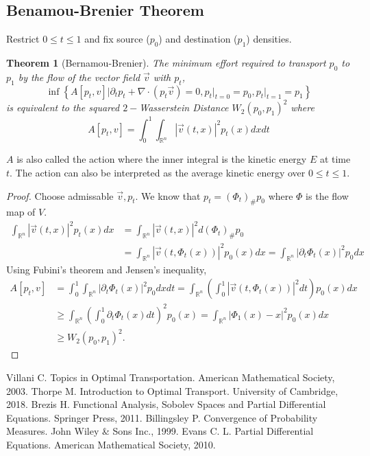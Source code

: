 \documentclass[12pt]{article}
\theoremstyle{plain}
\newtheorem{thm}{Theorem}[section]
\numberwithin{equation}{section}
\begin{document}
\subsection{Benamou-Brenier Theorem}
Restrict $0\le t \le 1$ and fix source ($p_0$) and destination ($p_1$) densities.
\begin{thm}[Bernamou-Brenier]
	The minimum effort required to transport $p_0$ to $p_1$ by the flow of the vector field $\vec{v}$ with $p_t$,
	\begin{equation}
		\inf\left\{A[p_t,v]\bigg\vert\partial_t p_t + \nabla \cdot (p_t \vec{v}) = 0,p_t\vert_{t=0}=p_0, p_t\vert_{t=1}=p_1\right\}
	\end{equation} 
	is equivalent to the squared $2-$Wasserstein Distance $W_2(p_0,p_1)^2$ where \[A[p_t,v] = \int_0^1\int_{\mathbb{R}^n} |\vec{v}(t,x)|^2p_t(x)dxdt\]
\end{thm}
$A$ is also called the action where the inner integral is the kinetic energy $E$ at time $t$. The action can also be interpreted as the average kinetic energy over $0\le t \le 1$. 
\begin{proof}
	Choose admissable $\vec{v},p_t$. We know that $p_t = (\Phi_t)_\#p_0$ where $\Phi$ is the flow map of $V$.
	\begin{align*}
		\int_{\mathbb{R}^n}|\vec{v}(t,x)|^2p_t(x)dx &= \int_{\mathbb{R}^n}|\vec{v}(t,x)|^2 d(\Phi_t)_\#p_0\\
		&= \int_{\mathbb{R}^n}|\vec{v}(t,\Phi_t(x))|^2p_0(x)dx = \int_{\mathbb{R}^n}|\partial_t\Phi_t(x)|^2p_0dx
	\end{align*}
	Using Fubini's theorem and Jensen's inequality,
	\begin{align*}
		A[p_t,v] &= \int_0^1\int_{\mathbb{R}^n}|\partial_t\Phi_t(x)|^2p_0dxdt= \int_{\mathbb{R}^n}\left(\int_0^1|\vec{v}(t,\Phi_t(x))|^2dt\right)p_0(x)dx \\
		&\ge \int_{\mathbb{R}^n}\left(\int_0^1\partial_t\Phi_t(x)dt\right)^2p_0(x) = \int_{\mathbb{R}^n}|\Phi_1(x) - x|^2p_0(x)dx\\
		& \ge W_2(p_0,p_1)^2.
	\end{align*}
\end{proof}
\begin{thebibliography}{9}
Villani C.
Topics in Optimal Transportation.
American Mathematical Society, 2003.
Thorpe M.
Introduction to Optimal Transport.
University of Cambridge, 2018.
Brezis H.
Functional Analysis, Sobolev Spaces and Partial Differential Equations. 
Springer Press, 2011.
Billingsley P.
Convergence of Probability Measures.
John Wiley \& Sons Inc., 1999.
Evans C. L.
Partial Differential Equations.
American Mathematical Society, 2010.
\end{thebibliography}
\end{document}

